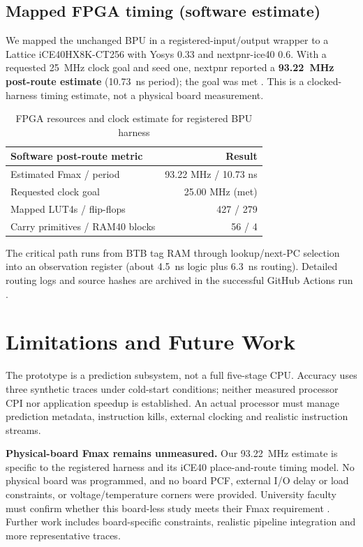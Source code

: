 \documentclass[conference,a4paper]{IEEEtran}
\begin{document}
\subsection{Mapped FPGA timing (software estimate)}
We mapped the unchanged BPU in a registered-input/output wrapper to a
Lattice iCE40HX8K-CT256 with Yosys 0.33 and nextpnr-ice40 0.6.
With a requested 25~MHz clock goal and seed one, nextpnr reported a
\textbf{93.22~MHz post-route estimate} (10.73~ns period); the goal
was met \cite{fpga}. This is a clocked-harness timing estimate,
not a physical board measurement.

\begin{table}[t]
\caption{FPGA resources and clock estimate for registered BPU harness}
\label{tab:fpga}
\centering
\begin{tabular}{@{}lr@{}}
\toprule
Software post-route metric & Result \\
\midrule
Estimated Fmax / period & 93.22 MHz / 10.73 ns \\
Requested clock goal & 25.00 MHz (met) \\
Mapped LUT4s / flip-flops & 427 / 279 \\
Carry primitives / RAM40 blocks & 56 / 4 \\
\bottomrule
\end{tabular}
\end{table}

The critical path runs from BTB tag RAM through lookup/next-PC
selection into an observation register (about 4.5~ns logic plus
6.3~ns routing). Detailed routing logs and source hashes are archived
in the successful GitHub Actions run \cite{fpga}.


\section{Limitations and Future Work}
The prototype is a prediction subsystem, not a full five-stage CPU.
Accuracy uses three synthetic traces under cold-start conditions;
neither measured processor CPI nor application speedup is established.
An actual processor must manage prediction metadata, instruction
kills, external clocking and realistic instruction streams.

\textbf{Physical-board Fmax remains unmeasured.} Our
93.22~MHz estimate is specific to the registered harness and its
iCE40 place-and-route timing model. No physical board was programmed,
and no board PCF, external I/O delay or load constraints, or
voltage/temperature corners were provided. University faculty must
confirm whether this board-less study meets their Fmax requirement
\cite{faculty}. Further work includes board-specific constraints,
realistic pipeline integration and more representative traces.
\end{document}
